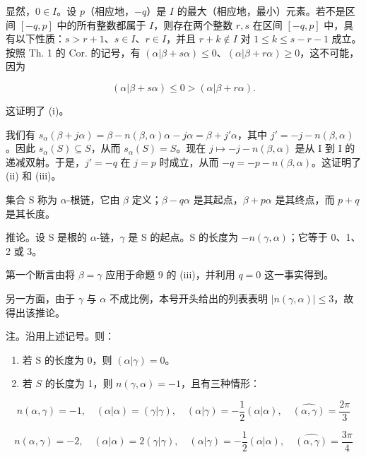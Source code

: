 显然，\(0 \in I\)。设 \(p\)（相应地，\(-q\)）是 \(I\) 的最大（相应地，最小）元素。若不是区间 \([-q, p]\) 中的所有整数都属于 \(I\)，则存在两个整数 \(r, s\) 在区间 \([-q, p]\) 中，具有以下性质：\(s > r + 1\)、\(s \in I\)、\(r \in I\)，并且 \(r + k \notin I\) 对 \(1 \leqslant k \leqslant s - r - 1\) 成立。按照 Th. 1 的 Cor. 的记号，有 \((\alpha|\beta + s\alpha) \leqslant 0\)、\((\alpha|\beta + r\alpha) \geqslant 0\)，这不可能，因为

\[
(\alpha | \beta + s \alpha) \leqslant 0 > (\alpha | \beta + r \alpha).
\]

这证明了 (i)。

我们有 \(s_{\alpha}(\beta + j\alpha) = \beta - n(\beta, \alpha)\alpha - j\alpha = \beta + j'\alpha\)，其中 \(j' = -j - n(\beta, \alpha)\)。因此 \(s_{\alpha}(S) \subseteq S\)，从而 \(s_{\alpha}(S) = S\)。现在 \(j \mapsto -j - n(\beta, \alpha)\) 是从 I 到 I 的递减双射。于是，\(j' = -q\) 在 \(j = p\) 时成立，从而 \(-q = -p - n(\beta, \alpha)\)。这证明了 (ii) 和 (iii)。

集合 S 称为 \(\alpha\)-根链，它由 \(\beta\) 定义；\(\beta - q\alpha\) 是其起点，\(\beta + p\alpha\) 是其终点，而 \(p + q\) 是其长度。

推论。设 S 是根的 \(\alpha\)-链，\(\gamma\) 是 S 的起点。S 的长度为 \(-n(\gamma,\alpha)\)；它等于 0、1、2 或 3。

第一个断言由将 \(\beta = \gamma\) 应用于命题 9 的 (iii)，并利用 \(q = 0\) 这一事实得到。

另一方面，由于 \(\gamma\) 与 \(\alpha\) 不成比例，本号开头给出的列表表明 \(|n(\gamma,\alpha)|\leqslant3\)，故得出该推论。

注。沿用上述记号。则：

\begin{enumerate}
\def\labelenumi{\arabic{enumi})}
\item
  若 S 的长度为 0，则 \((\alpha |\gamma) = 0\)。
\item
  若 \(S\) 的长度为 1，则 \(n(\gamma, \alpha) = -1\)，且有三种情形：
\end{enumerate}

\[
n (\alpha , \gamma) = - 1, \quad (\alpha | \alpha) = (\gamma | \gamma), \quad (\alpha | \gamma) = - \frac {1}{2} (\alpha | \alpha), \quad \widehat {(\alpha , \gamma)} = \frac {2 \pi}{3}
\]

\[
n (\alpha , \gamma) = - 2, \quad (\alpha | \alpha) = 2 (\gamma | \gamma), \quad (\alpha | \gamma) = - \frac {1}{2} (\alpha | \alpha), \quad \widehat {(\alpha , \gamma)} = \frac {3 \pi}{4}
\]

